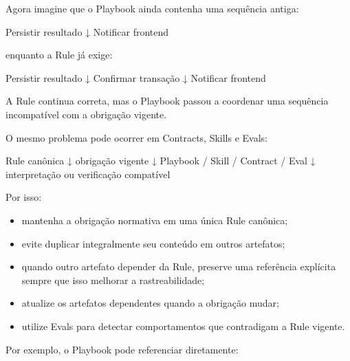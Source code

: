 \documentclass[
  10pt,
  a4paper,
  oneside]{book}
\newenvironment{Shaded}{}{}
\newcommand{\NormalTok}[1]{#1}
\providecommand{\tightlist}{%
  \setlength{\itemsep}{0pt}\setlength{\parskip}{0pt}}
\renewenvironment{Shaded}{\begin{snugshade}}{\end{snugshade}}%
\begin{document}
Agora imagine que o Playbook ainda contenha uma sequência antiga:

\begin{Shaded}
\begin{Highlighting}[]
\NormalTok{Persistir resultado}
\NormalTok{        ↓}
\NormalTok{Notificar frontend}
\end{Highlighting}
\end{Shaded}

enquanto a Rule já exige:

\begin{Shaded}
\begin{Highlighting}[]
\NormalTok{Persistir resultado}
\NormalTok{        ↓}
\NormalTok{Confirmar transação}
\NormalTok{        ↓}
\NormalTok{Notificar frontend}
\end{Highlighting}
\end{Shaded}

A Rule continua correta, mas o Playbook passou a coordenar uma sequência
incompatível com a obrigação vigente.

O mesmo problema pode ocorrer em Contracts, Skills e Evals:

\begin{Shaded}
\begin{Highlighting}[]
\NormalTok{Rule canônica}
\NormalTok{      ↓}
\NormalTok{obrigação vigente}
\NormalTok{      ↓}
\NormalTok{Playbook / Skill / Contract / Eval}
\NormalTok{      ↓}
\NormalTok{interpretação ou verificação compatível}
\end{Highlighting}
\end{Shaded}

Por isso:

\begin{itemize}
\tightlist
\item
  mantenha a obrigação normativa em uma única Rule canônica;
\item
  evite duplicar integralmente seu conteúdo em outros artefatos;
\item
  quando outro artefato depender da Rule, preserve uma referência
  explícita sempre que isso melhorar a rastreabilidade;
\item
  atualize os artefatos dependentes quando a obrigação mudar;
\item
  utilize Evals para detectar comportamentos que contradigam a Rule
  vigente.
\end{itemize}

Por exemplo, o Playbook pode referenciar diretamente:
\end{document}
